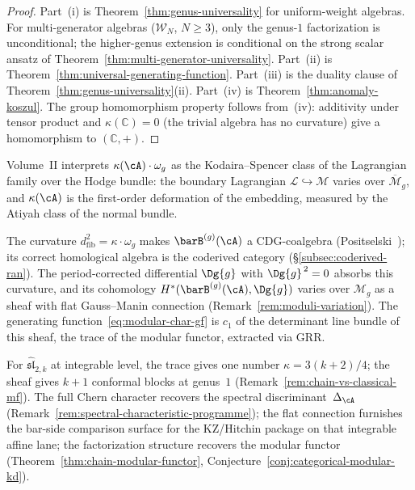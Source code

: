 \begin{proof}
Part~(i) is Theorem~\ref{thm:genus-universality} for
uniform-weight algebras.  For multi-generator algebras
($\mathcal{W}_N$, $N \geq 3$), only the genus-$1$ factorization
is unconditional; the higher-genus extension is conditional on the
strong scalar ansatz of
Theorem~\ref{thm:multi-generator-universality}.
Part~(ii) is Theorem~\ref{thm:universal-generating-function}.
Part~(iii) is the duality clause of
Theorem~\ref{thm:genus-universality}(ii).
Part~(iv) is Theorem~\ref{thm:anomaly-koszul}.
The group homomorphism property follows from~(iv): additivity
under tensor product and $\kappa(\mathbb{C}) = 0$ (the trivial
algebra has no curvature) give a homomorphism to $(\mathbb{C}, +)$.
\end{proof}

\begin{remark}
\label{rem:theorem-d-lagrangian}
Volume~II interprets $\kappa(\cA) \cdot \omega_g$ as the
Kodaira--Spencer class of the Lagrangian family over the Hodge
bundle: the boundary Lagrangian
$\mathcal{L} \hookrightarrow \mathcal{M}$ varies over
$\overline{\mathcal{M}}_g$, and $\kappa(\cA)$ is the first-order
deformation of the embedding, measured by the Atiyah class of the
normal bundle.
\end{remark}

\begin{remark}%
\label{rem:theorem-d-integrability}%
%
The curvature $d_{\mathrm{fib}}^2 = \kappa \cdot \omega_g$
makes $\barB^{(g)}(\cA)$ a CDG-coalgebra
(Positselski~\cite{Positselski11}); its correct
homological algebra is the coderived category
(\S\ref{subsec:coderived-ran}).  The period-corrected
differential $\Dg{g}$ with $\Dg{g}^{\,2} = 0$
absorbs this curvature, and its cohomology
$H^*(\barB^{(g)}(\cA), \Dg{g})$ varies over
$\mathcal{M}_g$ as a sheaf with flat Gauss--Manin connection
(Remark~\ref{rem:moduli-variation}).  The generating
function~\eqref{eq:modular-char-gf} is $c_1$ of the
determinant line bundle of this sheaf, the trace of the
modular functor, extracted via GRR.

For $\widehat{\mathfrak{sl}}_{2,k}$ at integrable level, the
trace gives one number $\kappa = 3(k{+}2)/4$; the sheaf
gives $k{+}1$ conformal blocks at genus~$1$
(Remark~\ref{rem:chain-vs-classical-mf}).  The full Chern
character recovers the spectral
discriminant~$\Delta_{\cA}$
(Remark~\ref{rem:spectral-characteristic-programme});
the flat connection furnishes the bar-side comparison surface for
the KZ/Hitchin package on that
integrable affine lane; the factorization structure recovers the modular
functor (Theorem~\ref{thm:chain-modular-functor},
Conjecture~\ref{conj:categorical-modular-kd}).
\end{remark}

